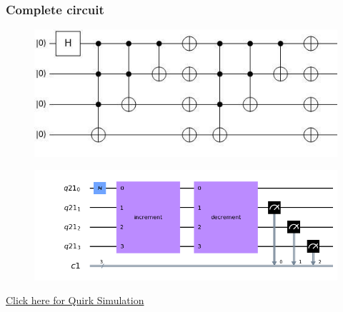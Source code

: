 \documentclass{beamer}
\begin{document}
\begin{frame}
    \frametitle{Complete circuit}
    \begin{figure}[h!]
        \includegraphics[scale=0.5]{img/cqw.jpg}
        \centering
    \end{figure}
    \begin{figure}[h!]
        \includegraphics[scale=0.4]{img/cqwqiskit.png}
        \centering
    \end{figure}
    
    \href{https://bit.ly/36uuySe}{Click here for Quirk Simulation}
\end{frame}
\end{document}
